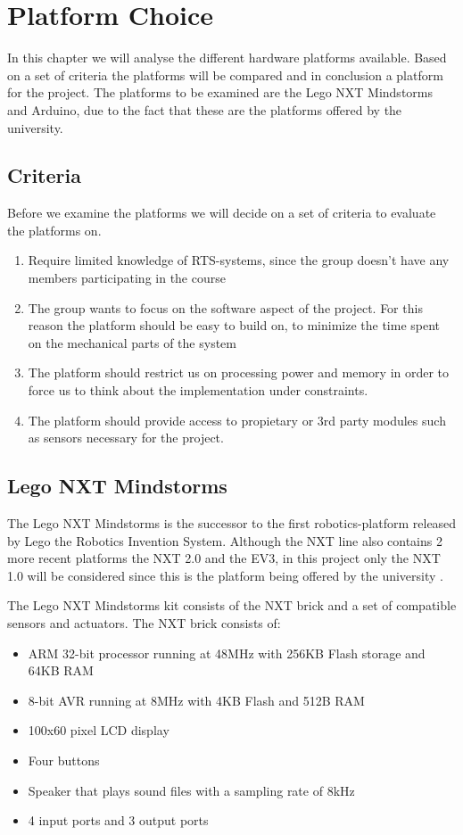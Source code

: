 \chapter{Platform Choice}

In this chapter we will analyse the different hardware platforms available. Based
on a set of criteria the platforms will be compared and in conclusion a platform for the
project. The platforms to be examined are the Lego NXT Mindstorms and Arduino,
due to the fact that these are the platforms offered by the university.
\section{Criteria}
Before we examine the platforms we will decide on a set of criteria to evaluate the platforms on.

\begin{enumerate}
  \item Require limited knowledge of RTS-systems, since the group doesn't have any members participating
  in the course
  \item The group wants to focus on the software aspect of the project. For this reason the platform should
  be easy to build on, to minimize the time spent on the mechanical parts of the system
  \item The platform should restrict us on processing power and memory in order to force us
  to think about the implementation under constraints.
  \item The platform should provide access to propietary or 3rd party modules such as sensors
  necessary for the project.
\end{enumerate}

\section{Lego NXT Mindstorms}
The Lego NXT Mindstorms is the successor to the first robotics-platform released
by Lego the Robotics Invention System. Although the NXT line also contains 2
more recent platforms the NXT 2.0 and the EV3, in this project only the NXT 1.0
will be considered since this is the platform being offered by the university
\Source.\nl

The Lego NXT Mindstorms kit consists of the NXT brick and a set of
compatible sensors and actuators. The NXT brick consists of: \Source
\begin{itemize}
  \item ARM 32-bit processor running at 48MHz with 256KB Flash storage and 64KB RAM
  \item 8-bit AVR running at 8MHz with 4KB Flash and 512B RAM
  \item 100x60 pixel LCD display
  \item Four buttons
  \item Speaker that plays sound files with a sampling rate of 8kHz
  \item 4 input ports and 3 output ports
\end{itemize}

